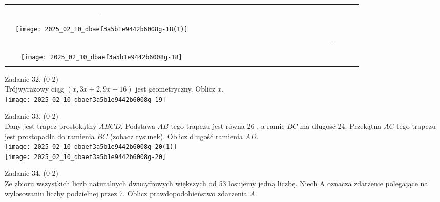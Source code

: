 \documentclass[10pt]{article}
\begin{document}
\begin{center}
\begin{tabular}{|c|c|c|c|c|c|c|c|c|c|c|c|c|c|c|c|c|c|c|c|c|c|c|c|c|}
\hline
 &  &  &  &  &  &  &  &  &  &  &  &  &  &  &  &  &  &  &  &  &  &  &  &  \\
\hline
 &  &  &  &  &  &  &  &  &  &  &  &  &  &  &  &  &  &  &  &  &  &  &  &  \\
\hline
 & - &  &  &  &  &  &  &  &  &  &  &  &  &  &  &  &  &  &  &  &  &  &  &  \\
\hline
 &  &  &  &  &  &  &  &  &  &  &  &  &  &  &  &  &  &  &  &  &  &  &  &  \\
\hline
 & \texttt{[image: 2025\_02\_10\_dbaef3a5b1e9442b6008g-18(1)]}
 &  &  &  &  &  &  &  &  &  &  &  &  &  &  &  &  &  &  &  &  &  &  &  \\
\hline
 &  &  &  &  &  &  &  &  &  &  &  &  &  &  &  &  &  &  &  &  & - &  &  &  \\
\hline
 &  &  &  &  &  &  &  &  &  &  &  &  &  &  &  &  &  &  &  &  &  &  &  &  \\
\hline
 & \texttt{[image: 2025\_02\_10\_dbaef3a5b1e9442b6008g-18]}
 &  &  &  &  &  &  &  &  &  &  &  &  &  &  &  &  &  &  &  &  &  &  &  \\
\hline
 &  &  &  &  &  &  &  &  &  &  &  &  &  &  &  &  &  &  &  &  &  &  &  &  \\
\hline
\end{tabular}
\end{center}

Zadanie 32. (0-2)\\
Trójwyrazowy ciąg \((x, 3 x+2,9 x+16)\) jest geometryczny. Oblicz \(x\).\\
\texttt{[image: 2025\_02\_10\_dbaef3a5b1e9442b6008g-19]}

Zadanie 33. (0-2)\\
Dany jest trapez prostokątny \(A B C D\). Podstawa \(A B\) tego trapezu jest równa 26 , a ramię \(B C\) ma długość 24. Przekątna \(A C\) tego trapezu jest prostopadła do ramienia \(B C\) (zobacz rysunek). Oblicz długość ramienia \(A D\).\\
\texttt{[image: 2025\_02\_10\_dbaef3a5b1e9442b6008g-20(1)]}\\
\texttt{[image: 2025\_02\_10\_dbaef3a5b1e9442b6008g-20]}

Zadanie 34. (0-2)\\
Ze zbioru wszystkich liczb naturalnych dwucyfrowych większych od 53 losujemy jedną liczbę. Niech A oznacza zdarzenie polegające na wylosowaniu liczby podzielnej przez 7. Oblicz prawdopodobieństwo zdarzenia \(A\).
\end{document}
